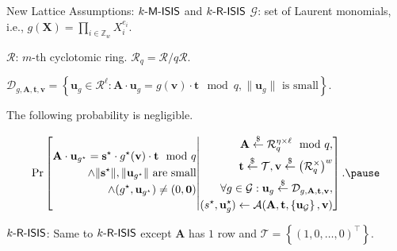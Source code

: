 \begin{frame}{New Lattice Assumptions: $k\textsf{-M-ISIS}$ and $k\textsf{-R-ISIS}$}
	$\mathcal{G}$: set of Laurent monomials, i.e., $g(\mathbf{X}) = \prod_{i\in \mathbb{Z}_w}X_i^{e_i}$.\pause
	
	$\mathcal{R}$: $m$-th cyclotomic ring. $\mathcal{R}_q = \mathcal{R}/q\mathcal{R}$.\pause
	
	$\mathcal{D}_{g, \mathbf{A}, \mathbf{t}, \mathbf{v}} = \left\{\mathbf{u}_g\in\mathcal{R}^\ell : \mathbf{A}\cdot \mathbf{u}_g = g(\mathbf{v})\cdot\mathbf{t} \mod q, \lVert\mathbf{u}_g\rVert \text{ is small}\right\}$.\pause
	
	The following probability is negligible.\pause
	
	\begin{equation*}
		\Pr\left[
		\begin{split}
			\mathbf{A}\cdot\mathbf{u}_{g^\star} = \mathbf{s}^\star \cdot g^\star(\mathbf{v})\cdot \mathbf{t}\mod q \\
			\wedge \text{$\lVert\mathbf{s}^\star\rVert, \lVert\mathbf{u}_{g^\star}\rVert$ are small}\\
			\wedge (g^\star, \mathbf{u}_{g^\star}) \not= (0, \mathbf{0})
		\end{split}
		\middle|
		\begin{split}
			\mathbf{A} \uniformly \mathcal{R}_q^{\eta\times \ell} \mod q,\\
			\mathbf{t}\uniformly\mathcal{T}, \mathbf{v}\uniformly \left(\mathcal{R}_q^\times \right)^w\\
			\forall g \in \mathcal{G}:\mathbf{u}_g \uniformly\mathcal{D}_{g, \mathbf{A}, \mathbf{t}, \mathbf{v}},\\
			(s^\star, \mathbf{u}_g^{\star}) \leftarrow \adversary(\mathbf{A}, \mathbf{t}, \left\{\mathbf{u}_\mathcal{G}\right\}, \mathbf{v})
		\end{split}
		\right].\pause
	\end{equation*}

	$k\textsf{-R-ISIS}$: Same to $k\textsf{-R-ISIS}$ except $\mathbf{A}$ has $1$ row and $\mathcal{T} = \left\{(1, 0, \dots, 0)^\top\right\}$.
\end{frame}